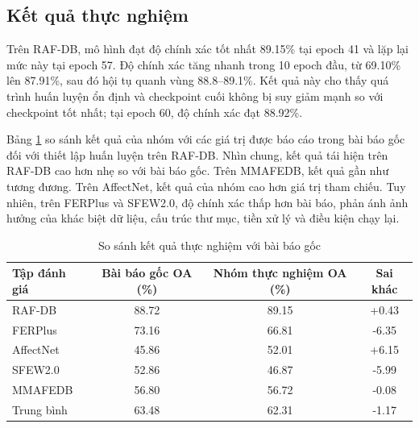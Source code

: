 \subsection{Kết quả thực nghiệm}



Trên RAF-DB, mô hình đạt độ chính xác tốt nhất 89.15\% tại epoch 41 và lặp lại mức này tại epoch 57. Độ chính xác tăng nhanh trong 10 epoch đầu, từ 69.10\% lên 87.91\%, sau đó hội tụ quanh vùng 88.8--89.1\%. Kết quả này cho thấy quá trình huấn luyện ổn định và checkpoint cuối không bị suy giảm mạnh so với checkpoint tốt nhất; tại epoch 60, độ chính xác đạt 88.92\%.

Bảng \ref{tab:paper_compare} so sánh kết quả của nhóm với các giá trị được báo cáo trong bài báo gốc đối với thiết lập huấn luyện trên RAF-DB. Nhìn chung, kết quả tái hiện trên RAF-DB cao hơn nhẹ so với bài báo gốc. Trên MMAFEDB, kết quả gần như tương đương. Trên AffectNet, kết quả của nhóm cao hơn giá trị tham chiếu. Tuy nhiên, trên FERPlus và SFEW2.0, độ chính xác thấp hơn bài báo, phản ánh ảnh hưởng của khác biệt dữ liệu, cấu trúc thư mục, tiền xử lý và điều kiện chạy lại.

\begin{table}[htbp]
\centering
\caption{So sánh kết quả thực nghiệm với bài báo gốc}
\label{tab:paper_compare}
\begin{tabular}{lccc}
\hline
\textbf{Tập đánh giá} & \textbf{Bài báo gốc OA (\%)} & \textbf{Nhóm thực nghiệm OA (\%)} & \textbf{Sai khác} \\
\hline
RAF-DB & 88.72 & 89.15 & +0.43 \\
FERPlus & 73.16 & 66.81 & -6.35 \\
AffectNet & 45.86 & 52.01 & +6.15 \\
SFEW2.0 & 52.86 & 46.87 & -5.99 \\
MMAFEDB & 56.80 & 56.72 & -0.08 \\
Trung bình & 63.48 & 62.31 & -1.17 \\
\hline
\end{tabular}
\end{table}


